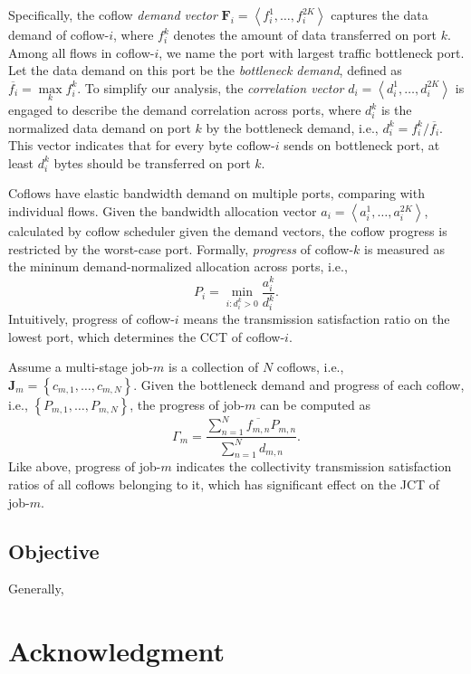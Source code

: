 \documentclass[10pt, conference, letterpaper]{IEEEtran}
\begin{document}
Specifically, the coflow \emph{demand vector} $\mathbf{F}_i = \left\langle f_i^1,\dots,f_i^{2K}\right\rangle$ captures the data demand of coflow-$i$, where $f_i^k$ denotes the amount of data transferred on port $k$. Among all flows in coflow-$i$, we name the port with largest traffic bottleneck port. Let the data demand on this port be the \emph{bottleneck demand}, defined as $\overline{f_i}=\max\limits_{k} f_i^k$. To simplify our analysis, the \emph{correlation vector} $d_i = \left\langle d_i^1,\dots,d_i^{2K}\right\rangle$ is engaged to describe the demand correlation across ports, where $d_i^k$ is the normalized data demand on port $k$ by the bottleneck demand, i.e., $d_i^k = f_i^k/\overline{f_i}$. This vector indicates that for every byte coflow-$i$ sends on bottleneck port, at least $d_i^k$ bytes should be transferred on port $k$.
 
Coflows have elastic bandwidth demand on multiple ports, comparing with individual flows. Given the bandwidth allocation vector $a_i=\left\langle a_i^1,\dots,a_i^{2K}\right\rangle$, calculated by coflow scheduler given the demand vectors, the coflow progress is restricted by the worst-case port. Formally, \emph{progress} of coflow-$k$ is measured as the mininum demand-normalized allocation across ports, i.e.,
 \begin{equation}
 	P_i = \min\limits_{i:d_i^k>0}\frac{a_i^k}{d_i^k}.
 \end{equation}
 Intuitively, progress of coflow-$i$ means the transmission satisfaction ratio on the lowest port, which determines the CCT of coflow-$i$.
 
Assume a multi-stage job-$m$ is a collection of $N$ coflows, i.e., $\mathbf{J}_m=\left\{c_{m,1},\dots,c_{m,N}\right\}$. Given the bottleneck demand and progress of each coflow, i.e., $\left\{P_{m,1},\dots,P_{m,N}\right\}$, the progress of job-$m$ can be computed as
\begin{equation}
	\Gamma_m = \frac{\sum_{n=1}^N \overline{f_{m,n}}P_{m,n}}{\sum_{n=1}^N d_{m,n}}.
\end{equation}
Like above, progress of job-$m$ indicates the collectivity transmission satisfaction ratios of all coflows belonging to it, which has significant effect on the JCT of job-$m$.

\subsection{Objective}
Generally, 

\section*{Acknowledgment}
\end{document}
